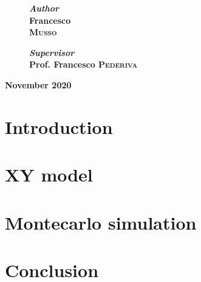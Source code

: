 \documentclass[12pt,twoside,openany]{report}
\begin{document}
\begin{titlepage}
\vfill

\begin{figure}[h]
\centering
\begin{minipage}{0.4\textwidth}
			    
\Large
\textbf{\textit{Author}\\
	Francesco\\ \textsc{Musso}} %

\end{minipage}
\qquad \qquad \qquad
\begin{minipage}{0.4\textwidth}

\begin{flushright}
\Large
\textbf{\textit{Supervisor}\\
	Prof. Francesco \textsc{Pederiva}} %
\end{flushright}

\end{minipage}
\end{figure}

\vfill
\textbf{{\Large November 2020}}

\end{titlepage}


\tableofcontents

\chapter{Introduction}



\chapter{XY model}



\chapter{Montecarlo simulation}



\chapter{Conclusion}


\printbibliography[heading=bibintoc]
\end{document}
